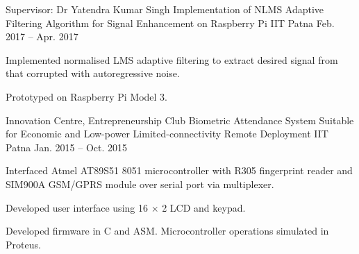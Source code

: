 
\begin{cventries}

\cventry
	{Supervisor: Dr Yatendra Kumar Singh}
	{Implementation of NLMS Adaptive Filtering Algorithm for Signal Enhancement on Raspberry Pi}
	{IIT Patna}
	{Feb. 2017 -- Apr. 2017} %
	{\begin{cvitems} %
		\item {Implemented normalised LMS adaptive filtering to extract desired signal from that corrupted with autoregressive noise.}
		\item {Prototyped on Raspberry Pi Model 3.}
	\end{cvitems}}

\cventry
	{Innovation Centre, Entrepreneurship Club}
	{Biometric Attendance System Suitable for Economic and Low-power Limited-connectivity Remote Deployment}
	{IIT Patna}
	{Jan. 2015 -- Oct. 2015} %
	{\begin{cvitems} %
		\item {Interfaced Atmel AT89S51 8051 microcontroller with R305 fingerprint reader and SIM900A GSM/GPRS module over serial port via multiplexer.}
		\item {Developed user interface using 16 $\times$ 2 LCD and keypad.}
		\item {Developed firmware in C and ASM. Microcontroller operations simulated in Proteus.}
	\end{cvitems}}

\end{cventries}
